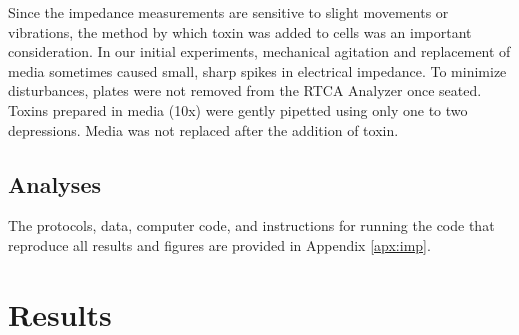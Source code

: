 Since the impedance measurements are sensitive to 
slight movements or vibrations, the method by which 
toxin was added to cells was an important consideration. 
In our initial experiments, mechanical agitation and 
replacement of media sometimes caused small, sharp 
spikes in electrical impedance. To minimize disturbances, 
plates were not removed from the RTCA Analyzer once 
seated. Toxins prepared in media (10x) were gently 
pipetted using only one to two depressions. Media was 
not replaced after the addition of toxin.

\subsection{Analyses}
The protocols, data, computer code, and instructions 
for running the code that reproduce all results and 
figures are provided in Appendix \autoref{apx:imp}.


\section{Results}

